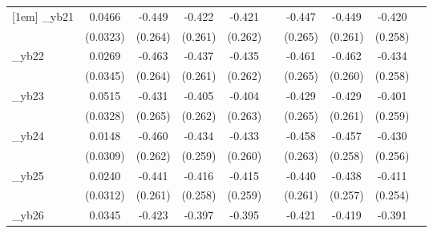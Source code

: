 \begin{table}[htbp]
\begin{tabular}{l*{9}{c}}
[1em]
\_yb21       &      0.0466         &      -0.449\sym{*}  &      -0.422         &      -0.421         &                     &      -0.447\sym{*}  &      -0.449\sym{*}  &      -0.420         &                     \\
            &    (0.0323)         &     (0.264)         &     (0.261)         &     (0.262)         &                     &     (0.265)         &     (0.261)         &     (0.258)         &                     \\
[1em]
\_yb22       &      0.0269         &      -0.463\sym{*}  &      -0.437\sym{*}  &      -0.435\sym{*}  &                     &      -0.461\sym{*}  &      -0.462\sym{*}  &      -0.434\sym{*}  &                     \\
            &    (0.0345)         &     (0.264)         &     (0.261)         &     (0.262)         &                     &     (0.265)         &     (0.260)         &     (0.258)         &                     \\
[1em]
\_yb23       &      0.0515         &      -0.431         &      -0.405         &      -0.404         &                     &      -0.429         &      -0.429         &      -0.401         &                     \\
            &    (0.0328)         &     (0.265)         &     (0.262)         &     (0.263)         &                     &     (0.265)         &     (0.261)         &     (0.259)         &                     \\
[1em]
\_yb24       &      0.0148         &      -0.460\sym{*}  &      -0.434\sym{*}  &      -0.433\sym{*}  &                     &      -0.458\sym{*}  &      -0.457\sym{*}  &      -0.430\sym{*}  &                     \\
            &    (0.0309)         &     (0.262)         &     (0.259)         &     (0.260)         &                     &     (0.263)         &     (0.258)         &     (0.256)         &                     \\
[1em]
\_yb25       &      0.0240         &      -0.441\sym{*}  &      -0.416         &      -0.415         &                     &      -0.440\sym{*}  &      -0.438\sym{*}  &      -0.411         &                     \\
            &    (0.0312)         &     (0.261)         &     (0.258)         &     (0.259)         &                     &     (0.261)         &     (0.257)         &     (0.254)         &                     \\
[1em]
\_yb26       &      0.0345         &      -0.423         &      -0.397         &      -0.395         &                     &      -0.421         &      -0.419         &      -0.391         &                     \\

\end{tabular}
\end{table}
